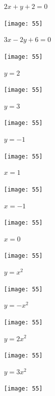 \documentclass[a4paper]{oblivoir}
\begin{document}
\clearpage
\begin{minipage}{0.45\textwidth}\centering
\(2x+y+2=0\)
\par\bigskip\texttt{[image: 55]}
\end{minipage}
\begin{minipage}{0.45\textwidth}\centering
\(3x-2y+6=0\)
\par\bigskip\texttt{[image: 55]}
\end{minipage}\bigskip\bigskip\par
\begin{minipage}{0.45\textwidth}\centering
\(y=2\)
\par\bigskip\texttt{[image: 55]}
\end{minipage}
\begin{minipage}{0.45\textwidth}\centering
\(y=3\)
\par\bigskip\texttt{[image: 55]}
\end{minipage}\bigskip\bigskip\par
\begin{minipage}{0.45\textwidth}\centering
\(y=-1\)
\par\bigskip\texttt{[image: 55]}
\end{minipage}
\begin{minipage}{0.45\textwidth}\centering
\(x=1\)
\par\bigskip\texttt{[image: 55]}
\end{minipage}\bigskip\bigskip\par


\clearpage
\begin{minipage}{0.45\textwidth}\centering
\(x=-1\)
\par\bigskip\texttt{[image: 55]}
\end{minipage}
\begin{minipage}{0.45\textwidth}\centering
\(x=0\)
\par\bigskip\texttt{[image: 55]}
\end{minipage}\bigskip\bigskip\par
\begin{minipage}{0.45\textwidth}\centering
\(y=x^2\)
\par\bigskip\texttt{[image: 55]}
\end{minipage}
\begin{minipage}{0.45\textwidth}\centering
\(y=-x^2\)
\par\bigskip\texttt{[image: 55]}
\end{minipage}\bigskip\bigskip\par
\begin{minipage}{0.45\textwidth}\centering
\(y=2x^2\)
\par\bigskip\texttt{[image: 55]}
\end{minipage}
\begin{minipage}{0.45\textwidth}\centering
\(y=3x^2\)
\par\bigskip\texttt{[image: 55]}
\end{minipage}\bigskip\bigskip\par
\end{document}
